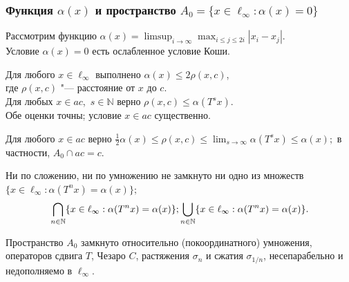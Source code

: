 \begin{varwidth}[v]{0.52\linewidth}
	\frametitle{Функция $\alpha(x)$ и пространство $A_0=\{x\in\ell_\infty:\alpha(x)=0\}$~\cite{avdeev2019space,our-ped-2018-alpha-Tx,our-vzms-2018}}

	Рассмотрим функцию
	$\displaystyle
		\alpha(x) = \limsup_{i\to\infty} \max_{i \leq j \leq 2i} |x_i-x_j|
	$.
	\\
	Условие $\alpha(x) = 0$ есть ослабленное условие Коши.
	\vspace{0.25em}

	\begin{lemma}
		Для любого $x\in\ell_\infty$
		выполнено
		$
			\alpha(x) \leq 2\rho(x, c)
		$,
		\\
		где $\rho(x,c)$ "--- расстояние от $x$ до $c$.
		\\
		Для любых $x\in ac$,~$s\in\mathbb{N}$ верно
		$
			\rho(x,c)\leq \alpha(T^s x)
		$.
		\\
		Обе оценки точны;
		условие $x\in ac$ существенно.
	\end{lemma}
	\begin{theorem}
		Для любого $x\in ac$ верно
		$\displaystyle
			\frac{1}{2} \alpha(x) \leq \rho(x,c)\leq \lim_{s\to\infty} \alpha(T^s x) \leq \alpha(x)
			;
		$
		в частности, $A_0 \cap ac = c$.
	\end{theorem}
	\vspace{0.2em}
	\begin{theorem}
		Ни по сложению, ни по умножению не замкнуто ни  одно из множеств
		$\displaystyle
			\{x \in \ell_\infty : \alpha(T^n x) = \alpha(x) \};%
		$~
		$$\displaystyle
			\bigcap\limits_{n\in\mathbb{N}}\{x \in \ell_\infty : \alpha(T^n x) = \alpha(x) \};
		\hfill
		\displaystyle
			\bigcup_{n\in\mathbb{N}}\{x \in \ell_\infty : \alpha(T^n x) = \alpha(x) \}
			.
		$$
		\vspace{-0.7em}
	\end{theorem}

	\begin{theorem}
		Пространство $A_0$ замкнуто относительно
		(покоординатного) умножения,
		операторов сдвига $T$, Чезаро $C$,
		растяжения $\sigma_n$ и сжатия $\sigma_{1/n}$,
		несепарабельно и недополняемо в $\ell_\infty$.
	\end{theorem}


\end{varwidth}
